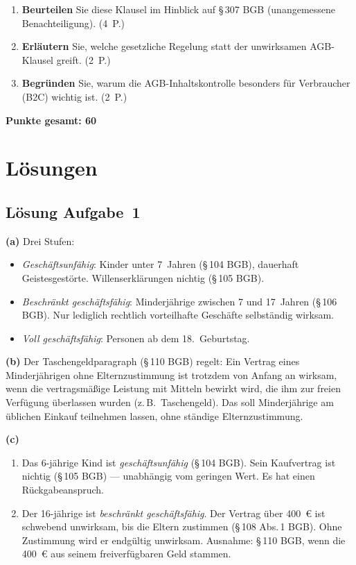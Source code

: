 \documentclass[11pt, a4paper]{article}
\begin{document}
\begin{enumerate}[label=(\alph*)]
  \item \textbf{Beurteilen} Sie diese Klausel im Hinblick auf §\,307 BGB (unangemessene Benachteiligung). \hfill (4~P.)
  \item \textbf{Erläutern} Sie, welche gesetzliche Regelung statt der unwirksamen AGB-Klausel greift. \hfill (2~P.)
  \item \textbf{Begründen} Sie, warum die AGB-Inhaltskontrolle besonders für Verbraucher (B2C) wichtig ist. \hfill (2~P.)
\end{enumerate}

\vspace{1em}
\noindent\textbf{Punkte gesamt: 60}

\newpage

\section{Lösungen}\label{loesungen}

\subsection*{Lösung Aufgabe~1}
\begin{loesung}
\textbf{(a)} Drei Stufen:
\begin{itemize}[itemsep=0pt]
  \item \emph{Geschäftsunfähig}: Kinder unter 7~Jahren (§\,104 BGB), dauerhaft Geistesgestörte. Willenserklärungen nichtig (§\,105 BGB).
  \item \emph{Beschränkt geschäftsfähig}: Minderjährige zwischen 7 und 17~Jahren (§\,106 BGB). Nur lediglich rechtlich vorteilhafte Geschäfte selbständig wirksam.
  \item \emph{Voll geschäftsfähig}: Personen ab dem 18.~Geburtstag.
\end{itemize}

\textbf{(b)} Der Taschengeldparagraph (§\,110 BGB) regelt: Ein Vertrag eines Minderjährigen
ohne Eltern­zustimmung ist trotzdem von Anfang an wirksam, wenn die vertragsmäßige
Leistung mit Mitteln bewirkt wird, die ihm zur freien Verfügung überlassen wurden
(z.\,B.\ Taschengeld). Das soll Minderjährige am üblichen Einkauf teilnehmen lassen,
ohne ständige Eltern­zustimmung.

\textbf{(c)}
\begin{enumerate}[itemsep=0pt]
  \item Das 6-jährige Kind ist \emph{geschäftsunfähig} (§\,104 BGB). Sein Kaufvertrag ist nichtig (§\,105 BGB) --- unabhängig vom geringen Wert. Es hat einen Rückgabeanspruch.
  \item Der 16-jährige ist \emph{beschränkt geschäftsfähig}. Der Vertrag über 400~€ ist schwebend unwirksam, bis die Eltern zustimmen (§\,108 Abs.\,1 BGB). Ohne Zustimmung wird er endgültig unwirksam. Ausnahme: §\,110 BGB, wenn die 400~€ aus seinem freiverfügbaren Geld stammen.
\end{enumerate}
\end{loesung}
\end{document}
